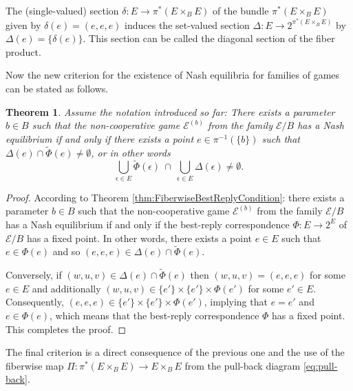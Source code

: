 \documentclass[a4paper,11pt,reqno,english]{amsart}
\theoremstyle{plain}
\newtheorem{theorem}{Theorem}[section]
\theoremstyle{definition}
\newcommand{\Ecal}{\mathcal{E}}
\begin{document}
\medskip
The (single-valued) section $\delta\colon E\longrightarrow \pi^*(E\times_B E)$ of the bundle $\pi^*(E\times_B E)$ given by $\delta(e)=(e,e,e)$ induces the set-valued section $\Delta\colon E\longrightarrow 2^{\pi^*(E\times_B E)}$ by $\Delta(e)=\{\delta(e)\}$.
This section can be called the diagonal section of the fiber product.

\medskip
Now the new criterion for the existence of Nash equilibria for families of games can be stated as follows.


\begin{theorem}\label{thm:criterion_01}
	Assume the notation introduced so far: There exists a parameter $b\in B$ such that the non-cooperative game $\Ecal^{(b)}$ from the family $\Ecal/B$ has a Nash equilibrium if and only if there exists a point $e\in \pi^{-1}(\{b\})$ such that $\Delta(e)\cap \widetilde{\Phi}(e)\neq\emptyset$, or in other words
	\begin{displaymath}
		\bigcup_{\epsilon\in E}\widetilde{\Phi} (\epsilon) \ \cap \ \bigcup_{\epsilon\in E} \Delta(\epsilon)\neq \emptyset.
	\end{displaymath}
\end{theorem}
\begin{proof}
	According to Theorem \ref{thm:FiberwiseBestReplyCondition}: there exists a parameter $b\in B$ such that the non-cooperative game $\Ecal^{(b)}$ from the family $\Ecal/B$ has a Nash equilibrium if and only if the best-reply correspondence $\Phi \colon E \longrightarrow 2^{E}$ of $\Ecal/B$  has a fixed point.
	In other words, there exists a point $e\in E$ such that $e\in \Phi(e)$ and so $(e,e,e)\in \Delta(e)\cap \widetilde{\Phi}(e)$.

	\smallskip\noindent
	Conversely, if $(w,u,v)\in \Delta(e)\cap \widetilde{\Phi}(e)$ then $(w,u,v)=(e,e,e)$ for some $e\in E$ and additionally  $(w,u,v)\in   \{e'\}\times\{e'\}\times  \Phi(e')$ for some $e'\in E$.
	Consequently, $(e,e,e)\in \{e'\}\times\{e'\}\times  \Phi(e')$, implying that $e=e'$ and $e\in \Phi(e)$, which means that the best-reply correspondence $\Phi$ has a fixed point.
	This completes the proof.
\end{proof}

\medskip
The final criterion is a direct consequence of the previous one and the use of the fiberwise map $\Pi\colon \pi^*(E\times_B E)\longrightarrow E\times_B E$ from the pull-back diagram \eqref{eq:pull-back}.
\end{document}
